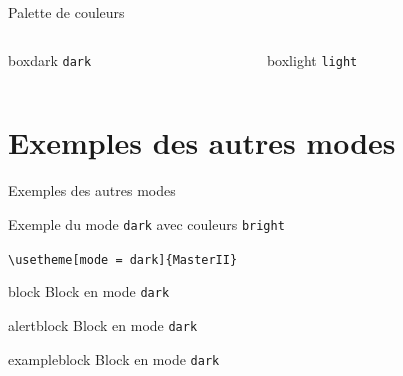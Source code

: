 \documentclass[french]{beamer}
\begin{document}
  \begin{frame}[c]{Palette de couleurs}
    \vspace{2ex}
    \begin{columns}[t]
      \hspace{2ex}
      \begin{column}{0.5\linewidth}
        \hspace{-0.1\linewidth}
        \begin{beamercolorbox}[rounded=true, center, dp=35.5ex]{boxdark}
          \texttt{dark}
        \end{beamercolorbox}
        \begin{minipage}[t]{0.9\linewidth}
          
        \end{minipage}
      \end{column}
      \begin{column}{0.5\linewidth}
        \hspace{-0.1\linewidth}
        \begin{beamercolorbox}[rounded=true, center, dp=35.5ex]{boxlight}
          \texttt{light}
        \end{beamercolorbox}
        \qquad\begin{minipage}[t]{0.9\linewidth}
          
        \end{minipage}
      \end{column}
    \end{columns}
  \end{frame}
  
  
  \section{Exemples des autres modes}
  
  \begin{frame}[standout]
    Exemples des autres modes
  \end{frame}
  
  {\darkmode\brightcolors
  \begin{frame}[fragile]{Exemple du mode \verb;dark; avec couleurs \verb:bright:}\label{exemples}
    \begin{center}
      \verb:\usetheme[mode = dark]{MasterII}:
    \end{center}
                
    \begin{block}{block}
      Block en mode \verb.dark.
    \end{block}
    \begin{alertblock}{alertblock}
      Block en mode \verb.dark.
    \end{alertblock}
    \begin{exampleblock}{exampleblock}
      Block en mode \verb.dark.
    \end{exampleblock}
  \end{frame}
  }
  
\end{document}
